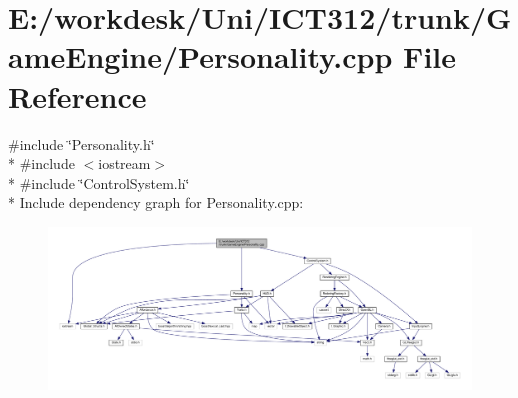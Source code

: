 \section{E\+:/workdesk/\+Uni/\+I\+C\+T312/trunk/\+Game\+Engine/\+Personality.cpp File Reference}
\label{_personality_8cpp}
{\ttfamily \#include \char`\"{}Personality.\+h\char`\"{}}\\*
{\ttfamily \#include $<$iostream$>$}\\*
{\ttfamily \#include \char`\"{}Control\+System.\+h\char`\"{}}\\*
Include dependency graph for Personality.\+cpp\+:\nopagebreak
\begin{figure}[H]
\begin{center}
\leavevmode
\includegraphics[width=350pt]{d0/d51/_personality_8cpp__incl}
\end{center}
\end{figure}
